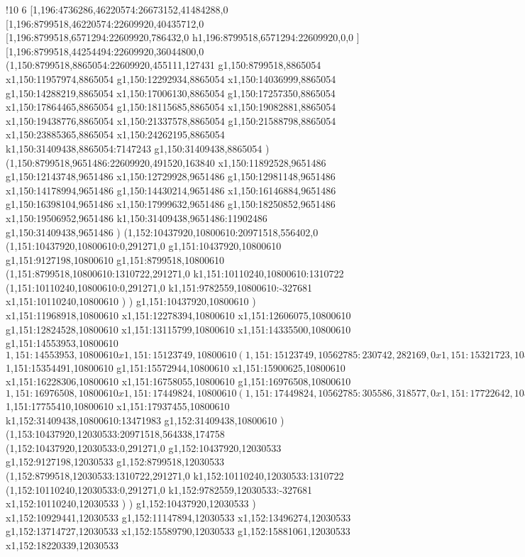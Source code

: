 !10
{6
[1,196:4736286,46220574:26673152,41484288,0
[1,196:8799518,46220574:22609920,40435712,0
[1,196:8799518,6571294:22609920,786432,0
h1,196:8799518,6571294:22609920,0,0
]
[1,196:8799518,44254494:22609920,36044800,0
(1,150:8799518,8865054:22609920,455111,127431
g1,150:8799518,8865054
x1,150:11957974,8865054
g1,150:12292934,8865054
x1,150:14036999,8865054
g1,150:14288219,8865054
x1,150:17006130,8865054
g1,150:17257350,8865054
x1,150:17864465,8865054
g1,150:18115685,8865054
x1,150:19082881,8865054
x1,150:19438776,8865054
x1,150:21337578,8865054
g1,150:21588798,8865054
x1,150:23885365,8865054
x1,150:24262195,8865054
k1,150:31409438,8865054:7147243
g1,150:31409438,8865054
)
(1,150:8799518,9651486:22609920,491520,163840
x1,150:11892528,9651486
g1,150:12143748,9651486
x1,150:12729928,9651486
g1,150:12981148,9651486
x1,150:14178994,9651486
g1,150:14430214,9651486
x1,150:16146884,9651486
g1,150:16398104,9651486
x1,150:17999632,9651486
g1,150:18250852,9651486
x1,150:19506952,9651486
k1,150:31409438,9651486:11902486
g1,150:31409438,9651486
)
(1,152:10437920,10800610:20971518,556402,0
(1,151:10437920,10800610:0,291271,0
g1,151:10437920,10800610
g1,151:9127198,10800610
g1,151:8799518,10800610
(1,151:8799518,10800610:1310722,291271,0
k1,151:10110240,10800610:1310722
(1,151:10110240,10800610:0,291271,0
k1,151:9782559,10800610:-327681
x1,151:10110240,10800610
)
)
g1,151:10437920,10800610
)
x1,151:11968918,10800610
x1,151:12278394,10800610
x1,151:12606075,10800610
g1,151:12824528,10800610
x1,151:13115799,10800610
x1,151:14335500,10800610
g1,151:14553953,10800610
$1,151:14553953,10800610
x1,151:15123749,10800610
(1,151:15123749,10562785:230742,282169,0
x1,151:15321723,10562785
)
$1,151:15354491,10800610
g1,151:15572944,10800610
x1,151:15900625,10800610
x1,151:16228306,10800610
x1,151:16758055,10800610
g1,151:16976508,10800610
$1,151:16976508,10800610
x1,151:17449824,10800610
(1,151:17449824,10562785:305586,318577,0
x1,151:17722642,10562785
)
$1,151:17755410,10800610
x1,151:17937455,10800610
k1,152:31409438,10800610:13471983
g1,152:31409438,10800610
)
(1,153:10437920,12030533:20971518,564338,174758
(1,152:10437920,12030533:0,291271,0
g1,152:10437920,12030533
g1,152:9127198,12030533
g1,152:8799518,12030533
(1,152:8799518,12030533:1310722,291271,0
k1,152:10110240,12030533:1310722
(1,152:10110240,12030533:0,291271,0
k1,152:9782559,12030533:-327681
x1,152:10110240,12030533
)
)
g1,152:10437920,12030533
)
x1,152:10929441,12030533
g1,152:11147894,12030533
x1,152:13496274,12030533
g1,152:13714727,12030533
x1,152:15589790,12030533
g1,152:15881061,12030533
x1,152:18220339,12030533
}
